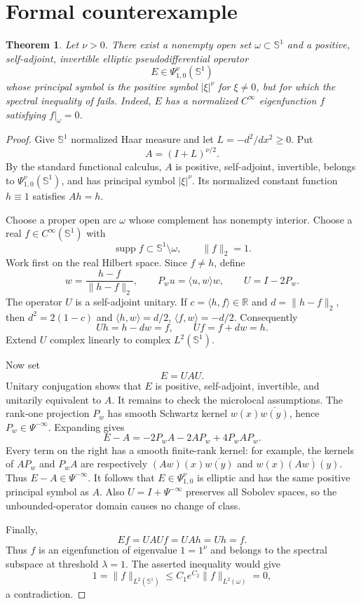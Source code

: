 \documentclass[11pt]{article}
\newtheorem{theorem}{Theorem}
\newcommand{\Sone}{\mathbb S^1}
\newcommand{\PsiDO}{\Psi}
\begin{document}
\section{Formal counterexample}

\begin{theorem}\label{thm:counterexample}
Let $\nu>0$.  There exist a nonempty open set $\omega\subset\Sone$ and a
positive, self-adjoint, invertible elliptic pseudodifferential operator
\[
 E\in\PsiDO^\nu_{1,0}(\Sone)
\]
whose principal symbol is the positive symbol $|\xi|^\nu$ for $\xi\ne0$, but
for which the spectral inequality of \cite[Theorem~1.4]{Cardona2209} fails.
Indeed, $E$ has a normalized $C^\infty$ eigenfunction $f$ satisfying
$f|_\omega=0$.
\end{theorem}

\begin{proof}
Give $\Sone$ normalized Haar measure and let
$L=-d^2/dx^2\geq0$.  Put
\[
 A=(I+L)^{\nu/2}.
\]
By the standard functional calculus, $A$ is positive, self-adjoint,
invertible, belongs to $\PsiDO^\nu_{1,0}(\Sone)$, and has principal symbol
$|\xi|^\nu$.  Its normalized constant function $h\equiv1$ satisfies $Ah=h$.

Choose a proper open arc $\omega$ whose complement has nonempty interior.
Choose a real $f\in C^\infty(\Sone)$ with
\[
 \operatorname{supp}f\subset\Sone\setminus\omega,
 \qquad \|f\|_2=1.
\]
Work first on the real Hilbert space.  Since $f\ne h$, define
\[
 w=\frac{h-f}{\|h-f\|_2},\qquad
 P_wu=\langle u,w\rangle w,\qquad U=I-2P_w.
\]
The operator $U$ is a self-adjoint unitary.  If
$c=\langle h,f\rangle\in\mathbb R$ and
$d=\|h-f\|_2$, then $d^2=2(1-c)$ and
$\langle h,w\rangle=d/2$, $\langle f,w\rangle=-d/2$.  Consequently
\[
 Uh=h-dw=f,\qquad Uf=f+dw=h.
\]
Extend $U$ complex linearly to complex $L^2(\Sone)$.

Now set
\[
 E=UAU.
\]
Unitary conjugation shows that $E$ is positive, self-adjoint, invertible, and
unitarily equivalent to $A$.  It remains to check the microlocal assumptions.
The rank-one projection $P_w$ has smooth Schwartz kernel
$w(x)\overline{w(y)}$, hence $P_w\in\PsiDO^{-\infty}$.  Expanding gives
\[
 E-A=-2P_wA-2AP_w+4P_wAP_w.
\]
Every term on the right has a smooth finite-rank kernel: for example, the
kernels of $AP_w$ and $P_wA$ are respectively
$(Aw)(x)\overline{w(y)}$ and
$w(x)\overline{(Aw)(y)}$.  Thus $E-A\in\PsiDO^{-\infty}$.
It follows that $E\in\PsiDO^\nu_{1,0}$ is elliptic and has the same positive
principal symbol as $A$.  Also $U=I+\PsiDO^{-\infty}$ preserves all Sobolev
spaces, so the unbounded-operator domain causes no change of class.

Finally,
\[
 Ef=UAUf=UAh=Uh=f.
\]
Thus $f$ is an eigenfunction of eigenvalue $1=1^\nu$ and belongs to the
spectral subspace at threshold $\lambda=1$.  The asserted inequality would
give
\[
 1=\|f\|_{L^2(\Sone)}
 \leq C_1e^{C_2}\|f\|_{L^2(\omega)}=0,
\]
a contradiction.
\end{proof}
\end{document}
